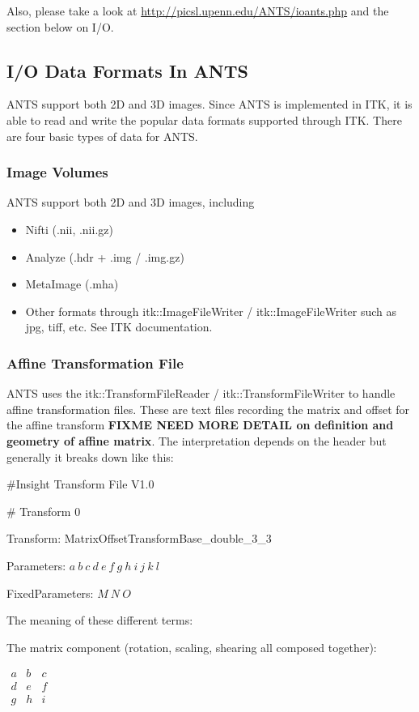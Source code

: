 \documentclass{InsightArticle}
\begin{document}
Also, please take a look at 
\href{http://picsl.upenn.edu/ANTS/ioants.php}{http://picsl.upenn.edu/ANTS/ioants.php} 
and the section below on I/O.

\subsection{I/O Data Formats In ANTS}
ANTS support both 2D and 3D images. 
Since ANTS is implemented in ITK, 
it is able to read and write the popular data formats supported through ITK. 
There are four basic types of data for ANTS.
\subsubsection{Image Volumes}
ANTS support both 2D and 3D images, including
\begin{itemize}
\item Nifti (.nii, .nii.gz)
\item Analyze (.hdr + .img / .img.gz)
\item MetaImage (.mha)
\item Other formats through itk::ImageFileWriter / itk::ImageFileWriter such as jpg, tiff, etc.  See ITK documentation. 
\end{itemize}
\subsubsection{Affine Transformation File}
ANTS uses the itk::TransformFileReader / itk::TransformFileWriter to handle affine transformation files. 
These are text files recording the matrix and offset for the affine transform {\bf FIXME NEED MORE DETAIL on definition and geometry of affine matrix}.
The interpretation depends on the header but generally it breaks down like this:   


\#Insight Transform File V1.0 

\# Transform 0 

Transform: MatrixOffsetTransformBase\_double\_3\_3 

Parameters:  $ a~b~c~d~e~f~g~h~i~j~k~l $ 

FixedParameters: $ M~N~O $

The meaning of these different terms: 

The matrix component (rotation, scaling, shearing all composed together): 

$ \begin{matrix}
a & b & c \\
d & e & f  \\
g & h & i \\ 
\end{matrix} $
\end{document}
